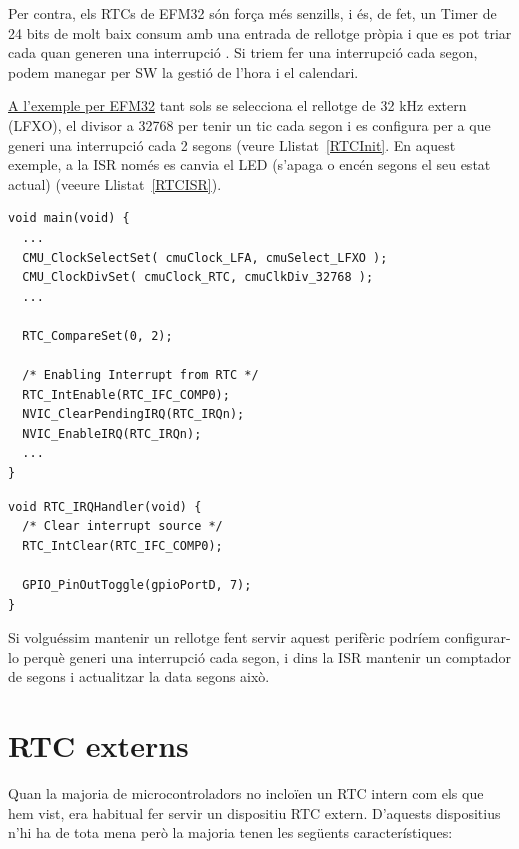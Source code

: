 Per contra, els RTCs de EFM32 són força més senzills, i és, de fet, un Timer de 24 bits de molt baix consum amb una entrada de rellotge pròpia i que es pot triar cada quan generen una interrupció \cite[285]{EFM32GRM}. Si triem fer una interrupció cada segon, podem manegar per SW la gestió de l'hora i el calendari.

\href{https://github.com/mariusmm/cursembedded/tree/master/Simplicity/RTC}{A l'exemple per EFM32} tant sols se selecciona el rellotge de 32 kHz extern (LFXO), el divisor a 32768 per tenir un tic cada segon i es configura per a que generi una interrupció cada 2 segons (veure Llistat~\ref{RTCInit}. En aquest exemple, a la \gls{ISR} només es canvia el LED (s'apaga o encén segons el seu estat actual) (veeure Llistat~\ref{RTCISR}).

\begin{lstlisting}[style=customc, caption={Inicialització del RTC}, label=RTCInit]
void main(void) {
  ...
  CMU_ClockSelectSet( cmuClock_LFA, cmuSelect_LFXO );
  CMU_ClockDivSet( cmuClock_RTC, cmuClkDiv_32768 );
  ...

  RTC_CompareSet(0, 2);

  /* Enabling Interrupt from RTC */
  RTC_IntEnable(RTC_IFC_COMP0);
  NVIC_ClearPendingIRQ(RTC_IRQn);
  NVIC_EnableIRQ(RTC_IRQn);
  ...
}
\end{lstlisting}

\begin{lstlisting}[style=customc,caption={ISR del RTC},label=RTCISR]
void RTC_IRQHandler(void) {
  /* Clear interrupt source */
  RTC_IntClear(RTC_IFC_COMP0);

  GPIO_PinOutToggle(gpioPortD, 7);
}
\end{lstlisting}


Si volguéssim mantenir un rellotge fent servir aquest perifèric podríem configurar-lo perquè generi una interrupció cada segon, i dins la \gls{ISR} mantenir un comptador de segons i actualitzar la data segons això.

\section{RTC externs}
Quan la majoria de microcontroladors no incloïen un RTC intern com els que hem vist, era habitual fer servir un dispositiu \gls{RTC} extern. D'aquests dispositius n'hi ha de tota mena però la majoria tenen les següents característiques:

